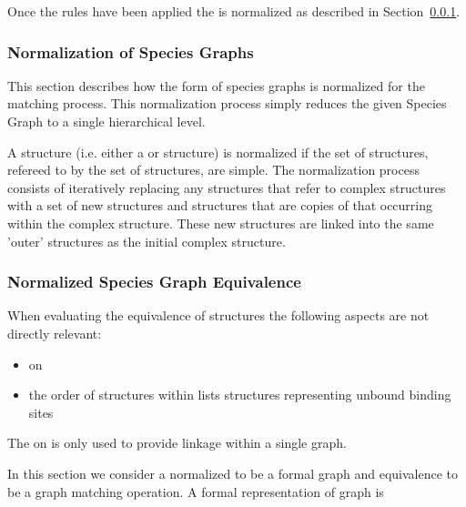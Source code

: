 \documentclass{cekarticle}
\begin{document}
Once the rules have been applied the  is normalized as described in
Section~\ref{sec:norm-graphs}.

\subsubsection{Normalization of Species Graphs}
\label{sec:norm-graphs}

This section describes how the form of species graphs is normalized for 
the matching process.  This normalization process simply reduces the
given Species Graph to a single hierarchical level.

A  structure (i.e. either a  or 
structure) is normalized if the set of  structures, refereed to by the set
of  structures, are simple.  
The normalization process consists of iteratively replacing any  structures
that refer to complex  structures with a set of new
 structures and  structures that are copies of that
occurring within the complex  structure.  These new structures are linked into
the same 'outer'  structures as the initial complex  structure.

\subsubsection{Normalized Species Graph Equivalence}
\label{sec:match-graphs}

When evaluating the equivalence of  structures the following aspects
are not directly relevant:
\begin{itemize}
\item {} on 
\item the order of structures within lists
 structures representing unbound binding sites
\end{itemize}

The  on  is only used to provide linkage within a single
graph.

In this section we consider a normalized  to be a formal graph and
equivalence to be a graph matching operation.  A formal representation of graph is
\end{document}
